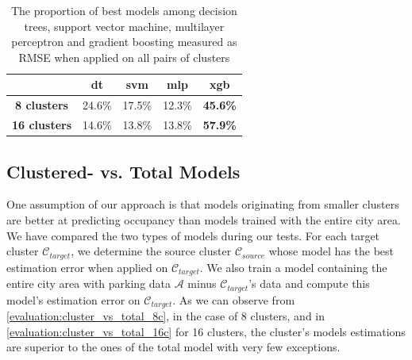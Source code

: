 \begin{table}[!ht]
	\centering
	\small
	\setlength\extrarowheight{5pt}
	\begin{tabular}{ | c | c | c | c | c |}
		\hline
		& \textbf{dt} & \textbf{svm} & \textbf{mlp} & \textbf{xgb} \\ \hline
		\textbf{8 clusters} & 24.6\% & 17.5\% & 12.3\% & \textbf{45.6\%} \\ \hline
		\textbf{16 clusters} & 14.6\% & 13.8\% & 13.8\% & \textbf{57.9\%} \\ \hline
	\end{tabular}
	\caption{The proportion of best models among decision trees, support vector machine, multilayer perceptron and gradient boosting  measured as RMSE when applied on all pairs of clusters}
	\label{evaluation:best_model_method}
\end{table}

\subsection{Clustered- vs. Total Models}
\label{small_vs_large}
One assumption of our approach is that models originating from smaller clusters are better at predicting occupancy than models trained with the entire city area.
We have compared the two types of models during our tests.
For each target cluster $\mathcal{C}_{target}$, we determine the source cluster $\mathcal{C}_{source}$ whose model has the best estimation error when applied on $\mathcal{C}_{target}$.
We also train a model containing the entire city area with parking data $\mathcal{A}$ minus $\mathcal{C}_{target}$'s data and compute this model's estimation error on $\mathcal{C}_{target}$.
As we can observe from \autoref{evaluation:cluster_vs_total_8c}, in the case of 8 clusters, and in \autoref{evaluation:cluster_vs_total_16c} for 16 clusters, the cluster's models estimations are superior to the ones of the total model with very few exceptions.

